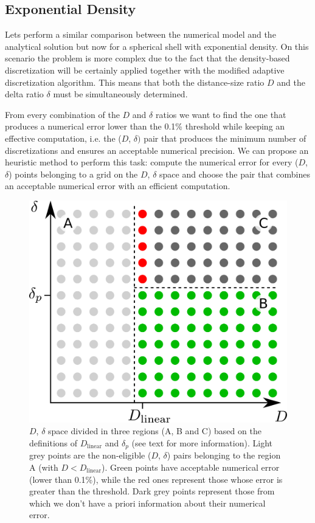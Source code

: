 \documentclass[extra]{gji}
\begin{document}
\subsection{Exponential Density}

Lets perform a similar comparison between the numerical model and 
the analytical solution but now for a spherical shell with exponential 
density.
On this scenario the problem is more complex due to the fact that the 
density-based discretization will be certainly applied together with 
the modified adaptive discretization algorithm.
This means that both the distance-size ratio $D$ and the delta ratio 
$\delta$ must be simultaneously determined.

From every combination of the $D$ and $\delta$ ratios we want to find 
the one that produces a numerical error lower than the 0.1\% threshold 
while keeping an effective computation, i.e. the ($D$, $\delta)$ pair 
that produces the minimum number of discretizations and ensures an 
acceptable numerical precision.
We can propose an heuristic method to perform this task: compute the 
numerical error for every ($D$, $\delta$) points belonging to a grid on 
the $D$, $\delta$ space and choose the pair that combines an 
acceptable numerical error with an efficient computation.

\begin{figure}
\centering
\includegraphics[width=\linewidth]
    {figures/D-delta-grid-search.pdf}
\caption{
    $D$, $\delta$ space divided in three regions (A, B and C) based on 
    the definitions of $D_\text{linear}$ and $\delta_p$ (see text for more 
    information).
    Light grey points are the non-eligible ($D$, $\delta$) pairs 
    belonging to the region A (with $D < D_\text{linear}$).
    Green points have acceptable numerical error (lower than 0.1\%), 
    while the red ones represent those whose error is greater than the 
    threshold.
    Dark grey points represent those from which we don't have a priori 
    information about their numerical error.}
\label{fig:D-delta-grid-search}
\end{figure}
\end{document}
